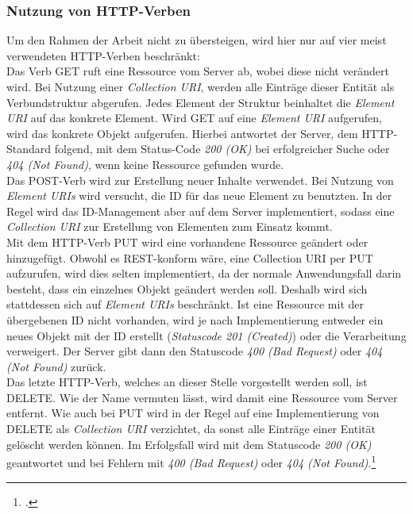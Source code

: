 \subsubsection*{Nutzung von HTTP-Verben}
Um den Rahmen der Arbeit nicht zu übersteigen, wird hier nur auf vier meist verwendeten \ac{HTTP}-Verben beschränkt:\\
Das Verb GET ruft eine Ressource vom Server ab, wobei diese nicht verändert wird. Bei Nutzung einer \textit{Collection \ac{URI}}, werden alle Einträge dieser Entität als Verbundstruktur abgerufen. Jedes Element der Struktur beinhaltet die \textit{Element URI} auf das konkrete Element. Wird GET auf eine \textit{Element URI} aufgerufen, wird das konkrete Objekt aufgerufen. Hierbei antwortet der Server, dem \ac{HTTP}-Standard folgend, mit dem Status-Code \textit{200 (OK)} bei erfolgreicher Suche oder \textit{404 (Not Found)}, wenn keine Ressource gefunden wurde.\\
Das POST-Verb wird zur Erstellung neuer Inhalte verwendet. Bei Nutzung von \textit{Element \ac{URI}s} wird versucht, die ID für das neue Element zu benutzten. In der Regel wird das ID-Management aber auf dem Server implementiert, sodass eine \textit{Collection \ac{URI}} zur Erstellung von Elementen zum Einsatz kommt.\\
Mit dem HTTP-Verb PUT wird eine vorhandene Ressource geändert oder hinzugefügt. Obwohl es \ac{REST}-konform wäre, eine Collection \ac{URI} per PUT aufzurufen, wird dies selten implementiert, da der normale Anwendungsfall darin besteht, dass ein einzelnes Objekt geändert werden soll. Deshalb wird sich stattdessen sich auf \textit{Element \ac{URI}s} beschränkt. Ist eine Ressource mit der übergebenen ID nicht vorhanden, wird je nach Implementierung entweder ein neues Objekt mit der ID erstellt (\textit{Statuscode 201 (Created)}) oder die Verarbeitung verweigert. Der Server gibt dann den Statuscode \textit{400 (Bad Request)} oder \textit{404 (Not Found)}  zurück. \\
Das letzte \ac{HTTP}-Verb, welches an dieser Stelle vorgestellt werden soll, ist DELETE. Wie der Name vermuten lässt, wird damit eine Ressource vom Server entfernt. Wie auch bei PUT wird in der Regel auf eine Implementierung von DELETE als \textit{Collection \ac{URI}} verzichtet, da sonst alle Einträge einer Entität gelöscht werden können. Im Erfolgsfall wird mit dem Statuscode \textit{200 (OK)} geantwortet und bei Fehlern mit \textit{400 (Bad Request)} oder \textit{404 (Not Found)}.\footcite[S. 26ff.]{REST-und-HTTP}
